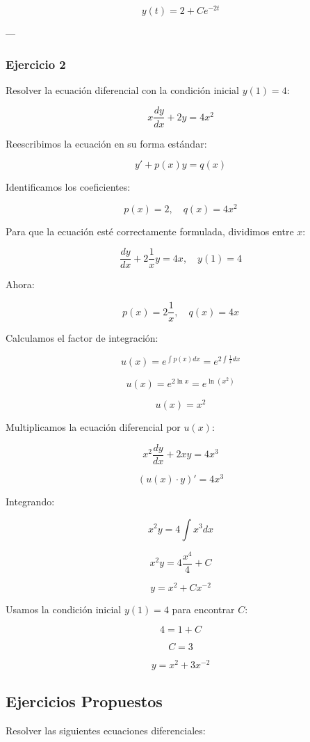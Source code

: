 \[
y(t) = 2 + Ce^{-2t}
\]

---

\subsubsection{Ejercicio 2}

Resolver la ecuación diferencial con la condición inicial \( y(1) = 4 \):

\[
x\frac{dy}{dx} + 2y = 4x^{2}
\]

Reescribimos la ecuación en su forma estándar:

\[
y' + p(x) y = q(x)
\]

Identificamos los coeficientes:

\[
p(x) = 2, \quad q(x) = 4x^2
\]

Para que la ecuación esté correctamente formulada, dividimos entre \( x \):

\[
\frac{dy}{dx} + 2\frac{1}{x} y = 4x, \quad y(1) = 4
\]

Ahora:

\[
p(x) = 2\frac{1}{x}, \quad q(x) = 4x
\]

Calculamos el factor de integración:

\[
u(x) = e^{\int p(x) dx} = e^{2\int \frac{1}{x} dx}
\]

\[
u(x) = e^{2\ln x} = e^{\ln(x^2)}
\]

\[
u(x) = x^2
\]

Multiplicamos la ecuación diferencial por \( u(x) \):

\[
x^{2} \frac{dy}{dx} + 2xy = 4x^{3}
\]

\[
(u(x) \cdot y)' = 4x^{3}
\]

Integrando:

\[
x^{2} y = 4\int x^{3} dx
\]

\[
x^{2} y = 4\frac{x^{4}}{4} +C
\]

\[
y = x^{2} + Cx^{-2}
\]

Usamos la condición inicial \( y(1) = 4 \) para encontrar \( C \):

\[
4 = 1 + C
\]

\[
C = 3
\]

\[
y = x^{2} + 3x^{-2}
\]


\subsection{Ejercicios Propuestos}

Resolver las siguientes ecuaciones diferenciales:

